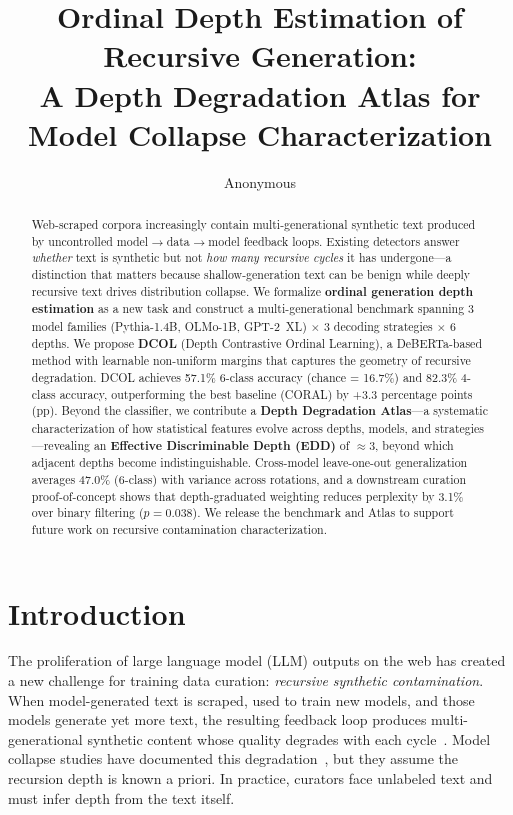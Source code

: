 \documentclass[11pt,a4paper]{article}
\title{Ordinal Depth Estimation of Recursive Generation:\\A Depth Degradation Atlas for Model Collapse Characterization}
\author{Anonymous}
\begin{document}
\maketitle

\begin{abstract}
Web-scraped corpora increasingly contain multi-generational synthetic text produced by uncontrolled model$\to$data$\to$model feedback loops.
Existing detectors answer \emph{whether} text is synthetic but not \emph{how many recursive cycles} it has undergone---a distinction that matters because shallow-generation text can be benign while deeply recursive text drives distribution collapse.
We formalize \textbf{ordinal generation depth estimation} as a new task and construct a multi-generational benchmark spanning 3 model families (Pythia-1.4B, OLMo-1B, GPT-2~XL) $\times$ 3 decoding strategies $\times$ 6 depths.
We propose \textbf{DCOL} (Depth Contrastive Ordinal Learning), a DeBERTa-based method with learnable non-uniform margins that captures the geometry of recursive degradation.
DCOL achieves 57.1\% 6-class accuracy (chance = 16.7\%) and 82.3\% 4-class accuracy, outperforming the best baseline (CORAL) by +3.3 percentage points (pp).
Beyond the classifier, we contribute a \textbf{Depth Degradation Atlas}---a systematic characterization of how statistical features evolve across depths, models, and strategies---revealing an \textbf{Effective Discriminable Depth (EDD)} of $\approx$3, beyond which adjacent depths become indistinguishable.
Cross-model leave-one-out generalization averages 47.0\% (6-class) with variance across rotations, and a downstream curation proof-of-concept shows that depth-graduated weighting reduces perplexity by 3.1\% over binary filtering ($p=0.038$).
We release the benchmark and Atlas to support future work on recursive contamination characterization.
\end{abstract}

\section{Introduction}
\label{sec:intro}

The proliferation of large language model (LLM) outputs on the web has created a new challenge for training data curation: \emph{recursive synthetic contamination}.
When model-generated text is scraped, used to train new models, and those models generate yet more text, the resulting feedback loop produces multi-generational synthetic content whose quality degrades with each cycle~\cite{shumailov2024model}.
Model collapse studies have documented this degradation~\cite{drayson2025emnlp}, but they assume the recursion depth is known a priori.
In practice, curators face unlabeled text and must infer depth from the text itself.
\end{document}
